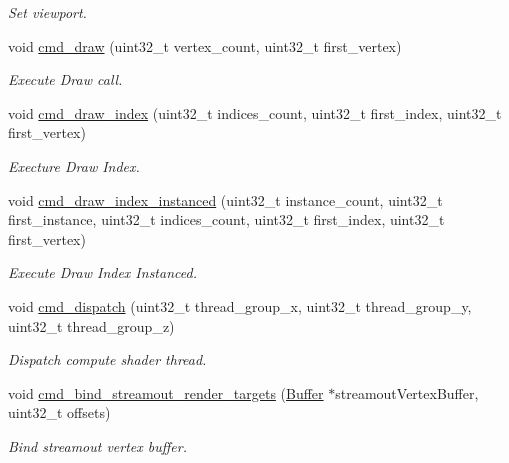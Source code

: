 \begin{DoxyCompactItemize}
\begin{DoxyCompactList}\small\item\em Set viewport. \end{DoxyCompactList}\item 
void \hyperlink{classDXRenderer_a46c26e36f9ec86763113f135423584a5}{cmd\+\_\+draw} (uint32\+\_\+t vertex\+\_\+count, uint32\+\_\+t first\+\_\+vertex)
\begin{DoxyCompactList}\small\item\em Execute Draw call. \end{DoxyCompactList}\item 
void \hyperlink{classDXRenderer_a6b826fbcfd25fcbe3d2996a4c4023e8a}{cmd\+\_\+draw\+\_\+index} (uint32\+\_\+t indices\+\_\+count, uint32\+\_\+t first\+\_\+index, uint32\+\_\+t first\+\_\+vertex)
\begin{DoxyCompactList}\small\item\em Execture Draw Index. \end{DoxyCompactList}\item 
void \hyperlink{classDXRenderer_a10c5015e326cef27739116f1a1d18e32}{cmd\+\_\+draw\+\_\+index\+\_\+instanced} (uint32\+\_\+t instance\+\_\+count, uint32\+\_\+t first\+\_\+instance, uint32\+\_\+t indices\+\_\+count, uint32\+\_\+t first\+\_\+index, uint32\+\_\+t first\+\_\+vertex)
\begin{DoxyCompactList}\small\item\em Execute Draw Index Instanced. \end{DoxyCompactList}\item 
void \hyperlink{classDXRenderer_a477f9b9bec26bde95a0aeae3dd8b7395}{cmd\+\_\+dispatch} (uint32\+\_\+t thread\+\_\+group\+\_\+x, uint32\+\_\+t thread\+\_\+group\+\_\+y, uint32\+\_\+t thread\+\_\+group\+\_\+z)
\begin{DoxyCompactList}\small\item\em Dispatch compute shader thread. \end{DoxyCompactList}\item 
void \hyperlink{classDXRenderer_a8fdbb3e30aeeb14d719b6afcc086fe8d}{cmd\+\_\+bind\+\_\+streamout\+\_\+render\+\_\+targets} (\hyperlink{classBuffer}{Buffer} $\ast$streamout\+Vertex\+Buffer, uint32\+\_\+t offsets)
\begin{DoxyCompactList}\small\item\em Bind streamout vertex buffer. \end{DoxyCompactList}\item 
\mbox{\label{classDXRenderer_a55c751afe6f80a0b39dbad2d65d75184}} 

\end{DoxyCompactItemize}
